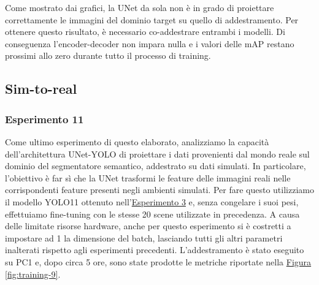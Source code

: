 \documentclass[12pt]{report}
\begin{document}
Come mostrato dai grafici, la UNet da sola non è in grado di proiettare correttamente le immagini del dominio target su quello di addestramento. Per ottenere questo risultato, è necessario co-addestrare entrambi i modelli. Di conseguenza l'encoder-decoder non impara nulla e i valori delle mAP restano prossimi allo zero durante tutto il processo di training.

\subsection{Sim-to-real}
\label{sec:sim_to_real_fr}

\subsubsection{Esperimento 11}
\label{sec:esperimento_11}

Come ultimo esperimento di questo elaborato, analizziamo la capacità dell'architettura UNet-YOLO di proiettare i dati provenienti dal mondo reale sul dominio del segmentatore semantico, addestrato su dati simulati. In particolare, l'obiettivo è far sì che la UNet trasformi le feature delle immagini reali nelle corrispondenti feature presenti negli ambienti simulati. Per fare questo utilizziamo il modello YOLO11 ottenuto nell'\hyperref[sec:esperimento_3]{Esperimento 3} e, senza congelare i suoi pesi, effettuiamo fine-tuning con le stesse 20 scene utilizzate in precedenza. A causa delle limitate risorse hardware, anche per questo esperimento si è costretti a impostare ad 1 la dimensione del batch, lasciando tutti gli altri parametri inalterati rispetto agli esperimenti precedenti. L'addestramento è stato eseguito su PC1 e, dopo circa 5 ore, sono state prodotte le metriche riportate nella \hyperref[fig:training-9]{Figura \ref{fig:training-9}}.
\end{document}
